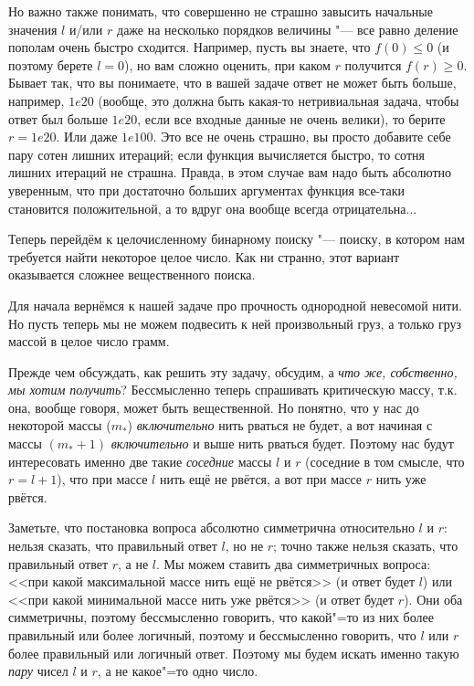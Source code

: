 \documentclass[a4paper,10pt]{problems}
\begin{document}
Но важно также понимать, что совершенно не страшно завысить начальные значения $l$ и/или $r$ даже на несколько порядков величины
"--- все равно деление пополам очень быстро сходится.
Например, пусть вы знаете, что $f(0)\leq 0$ (и поэтому берете $l=0$), но вам сложно оценить, при каком $r$ получится $f(r)\geq 0$.
Бывает так, что вы понимаете, что в вашей задаче ответ не может быть больше, например, $1e20$ (вообще, это должна быть
какая-то нетривиальная задача, чтобы ответ был больше $1e20$, если все входные данные не очень велики), то берите $r=1e20$.
Или даже $1e100$. 
Это все не очень страшно, вы просто добавите себе пару сотен лишних итераций; если функция вычисляется быстро, то сотня лишних итераций не страшна.
Правда, в этом случае вам надо быть абсолютно уверенным, что при достаточно больших аргументах функция все-таки становится положительной,
а то вдруг она вообще всегда отрицательна...

Теперь перейдём к целочисленному бинарному поиску "--- поиску, в котором нам требуется найти некоторое целое число. 
Как ни странно, этот вариант оказывается сложнее вещественного поиска.

 Для начала вернёмся к нашей задаче про прочность однородной невесомой нити. 
Но пусть теперь мы не можем подвесить к ней произвольный груз, а только груз массой в целое число грамм.

Прежде чем обсуждать, как решить эту задачу, обсудим, а \textit{что же, собственно, мы хотим получить}? 
Бессмысленно теперь спрашивать критическую массу, т.к. она, вообще говоря, может быть вещественной.
Но понятно, что у нас до некоторой массы ($m_*$) \textit{включительно} нить рваться не будет, а вот начиная с массы
$(m_*+1)$ \textit{включительно} и выше нить рваться будет. 
Поэтому нас будут интересовать именно две такие \textit{соседние} массы $l$ и $r$ (соседние в том смысле, 
что $r=l+1$), что при массе $l$ нить ещё не рвётся,
а вот при массе $r$ нить уже рвётся.

Заметьте, что постановка вопроса абсолютно симметрична относительно $l$ и $r$: нельзя сказать, что правильный ответ $l$, но не $r$; 
точно также нельзя сказать, что правильный ответ $r$, а не $l$. 
Мы можем ставить два симметричных вопроса: <<при какой максимальной массе нить ещё не рвётся>> (и ответ будет $l$)
или <<при какой минимальной массе нить уже рвётся>> (и ответ будет $r$).
Они оба симметричны, поэтому бессмысленно говорить, что какой"=то из них более правильный или более логичный, поэтому
и бессмысленно говорить, что $l$ или $r$ более правильный или логичный ответ. 
Поэтому мы будем искать именно такую \textit{пару} чисел $l$ и $r$, а не какое"=то одно число.
\end{document}
